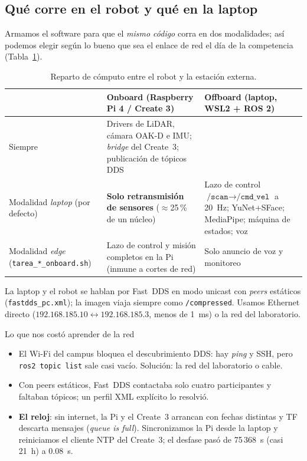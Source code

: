 \documentclass[11pt,a4paper]{article}
\newcommand{\cmd}[1]{\texttt{\small #1}}
\begin{document}
\subsection{Qu\'e corre en el robot y qu\'e en la laptop}
Armamos el software para que el \emph{mismo c\'odigo} corra en dos modalidades; as\'i podemos elegir seg\'un lo bueno que sea el enlace de red el d\'ia de la
competencia (Tabla~\ref{tab:computo}).

\begin{table}[H]
\centering\small
\begin{tabularx}{\textwidth}{@{}l>{\raggedright\arraybackslash}X>{\raggedright\arraybackslash}X@{}}
\toprule
 & \textbf{Onboard (Raspberry Pi 4 / Create 3)} & \textbf{Offboard (laptop, WSL2 + ROS 2)} \\
\midrule
Siempre & Drivers de LiDAR, c\'amara OAK-D e IMU; \emph{bridge} del Create~3; publicaci\'on de t\'opicos DDS & \\
Modalidad \emph{laptop} (por defecto) & \textbf{Solo retransmisi\'on de sensores} ($\approx$25\,\% de un n\'ucleo) &
Lazo de control $\texttt{/scan}\!\to\!\texttt{/cmd\_vel}$ a 20~Hz; YuNet+SFace; MediaPipe; m\'aquina de estados; voz \\
Modalidad \emph{edge} (\texttt{tarea\_*\_onboard.sh}) & Lazo de control y misi\'on completos en la Pi (inmune a cortes de red) &
Solo anuncio de voz y monitoreo \\
\bottomrule
\end{tabularx}
\caption{Reparto de c\'omputo entre el robot y la estaci\'on externa.}
\label{tab:computo}
\end{table}

La laptop y el robot se hablan por Fast~DDS en modo unicast con \emph{peers} est\'aticos (\texttt{fastdds\_pc.xml}); la imagen viaja siempre como
\cmd{/compressed}. Usamos Ethernet directo ($192.168.185.10 \leftrightarrow 192.168.185.3$, menos de 1~ms) o la red del laboratorio.

\begin{leccion}{Lo que nos cost\'o aprender de la red}
\begin{itemize}[nosep]
\item El Wi-Fi del campus bloquea el descubrimiento DDS: hay \emph{ping} y SSH, pero \cmd{ros2 topic list} sale casi vac\'io. Soluci\'on: la red del
laboratorio o cable.
\item Con peers est\'aticos, Fast~DDS contactaba solo cuatro participantes y faltaban t\'opicos; un perfil XML expl\'icito lo resolvi\'o.
\item \textbf{El reloj}: sin internet, la Pi y el Create~3 arrancan con fechas distintas y TF descarta mensajes (\emph{queue is full}). Sincronizamos la
Pi desde la laptop y reiniciamos el cliente NTP del Create~3; el desfase pas\'o de 75\,368~s (casi 21~h) a 0.08~s.
\end{itemize}
\end{leccion}
\end{document}
